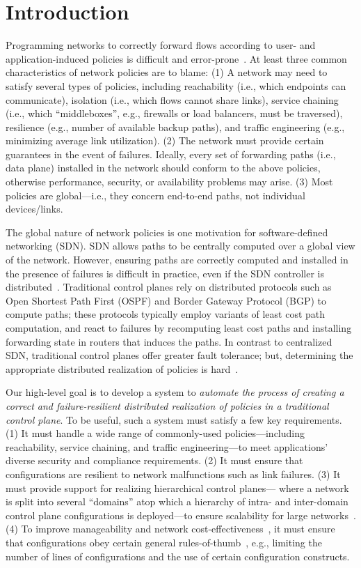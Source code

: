 \section{Introduction}
Programming networks to correctly forward flows according to user- and
application-induced policies is difficult and
error-prone~\cite{troubleshooting, bgpmisconfig}. 
At least three
common characteristics of network policies are to blame: (1) A network
may need to satisfy several types of policies, including reachability
(i.e., which endpoints can communicate), isolation (i.e., which flows
cannot share links), service chaining (i.e., which ``middleboxes'',
e.g., firewalls or load balancers, must be traversed), resilience
(e.g., number of available backup paths), and traffic engineering
(e.g., minimizing average link utilization). (2) The network must
provide certain guarantees in the event of failures. Ideally, every
set of forwarding paths (i.e., data plane) installed in the network
should conform to the above policies, otherwise performance, security, or
availability problems may arise. (3) Most policies are global---i.e.,
they concern end-to-end paths, not individual devices/links.

The global nature of network policies is one motivation for
software-defined networking (SDN). SDN allows paths to be centrally
computed over a global view of the network. However, ensuring paths
are correctly computed and installed in the presence of failures is
difficult in practice, even if the SDN controller is
distributed~\cite{hasdn}.  Traditional control planes rely on
distributed protocols such as Open Shortest Path First (OSPF) and
Border Gateway Protocol (BGP) to compute paths; these protocols
typically employ variants of least cost path computation, and react to
failures by recomputing least cost paths and installing forwarding
state in routers that induces the paths. In contrast to centralized
SDN, traditional control planes offer greater fault tolerance; but,
determining the appropriate distributed realization of policies is
hard~\cite{propane}.

Our high-level goal is to develop a system to {\em automate the
  process of creating a correct and failure-resilient distributed
  realization of policies in a traditional control plane}. To be
useful, such a system must satisfy a few key requirements. (1) It must
handle a wide range of commonly-used policies---including
reachability, service chaining, and traffic engineering---to meet
applications' diverse security and compliance requirements. (2) It
must ensure that configurations are resilient to network malfunctions
such as link failures. (3) It must provide support for realizing
hierarchical control planes--- where a network is split into several
``domains'' atop which a hierarchy of intra- and inter-domain control
plane configurations is deployed---to ensure scalability for large
networks~\cite{routingdesign}. (4) To improve manageability and
network cost-effectiveness~\cite{mpa-imc15,complexity:sigcomm11}, it
must ensure that configurations obey certain general
rules-of-thumb~\cite{complexity:nsdi09}, e.g., limiting the number of
lines of configurations and the use of certain configuration
constructs.


